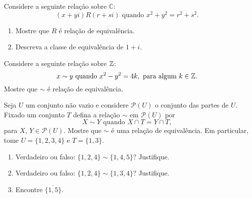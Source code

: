 \documentclass[12pt]{exam}
\begin{document}
    \vspace{.3cm}



    \vspace{.3cm}

    \questao{} Considere a seguinte rela{\c c}{\~a}o sobre $\mathbb{C}$:
    \[
        (x+yi) R (r+si) \mbox{ quando } x^2+y^2=r^2+s^2.
    \]
    \begin{enumerate}[label={\alph*})]
        \item Mostre que $R$ {\'e} rela{\c c}{\~a}o de equival{\^e}ncia.
        \item Descreva a classe de equival{\^e}ncia de $1+i$.
    \end{enumerate}

    \vspace{.3cm}

    \questao{} Considere a seguinte rela\c{c}\~ao sobre $\mathbb{Z}$:
    \[
        x \sim y \mbox{ quando }  x^2 - y^2 = 4k, \mbox{ para algum } k \in \mathbb{Z}.
    \]
    Mostre que $\sim$ {\'e} rela{\c c}{\~a}o de equival{\^e}ncia.

    \vspace{.3cm}

    \questao{} Seja $U$ um conjunto não vazio e considere $\mathcal{P}(U)$ o conjunto das partes de $U$. Fixado um conjunto $T$ defina a relação $\sim$ em $\mathcal{P}(U)$ por
    \[
        X \sim Y \mbox{ quando } X \cap T = Y \cap T,
    \]
    para $X$, $Y \in \mathcal{P}(U)$. Mostre que $\sim$ é uma relação de equivalência. Em particular, tome $U = \{1,2,3,4\}$ e $T = \{1,3\}$.
    \begin{enumerate}[label={\alph*})]
        \item Verdadeiro ou falso: $\{1,2,4\} \sim \{1,4,5\}$? Justifique.

        \item Verdadeiro ou falso: $\{1,2,4\} \sim \{1,3,4\}$? Justifique.

        \item Encontre $\overline{\{1,5\}}$.

    \end{enumerate}

    \vspace{.3cm}
\end{document}

